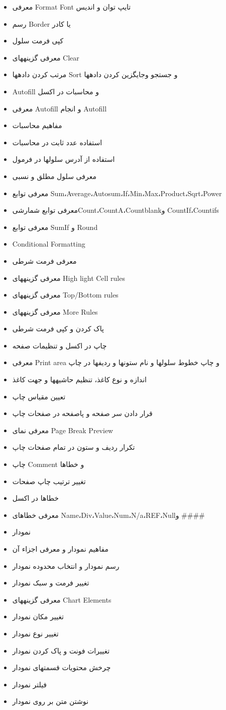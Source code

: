 \begin{itemize}
\item
معرفی Format Font تایپ توان و اندیس
\item
رسم Border یا کادر
\item
کپی فرمت سلول
\item
معرفی گزینه­های Clear
\item
مرتب کردن داده­ها Sort و جستجو وجایگزین کردن داده­ها
\item
Autofill و محاسبات در اکسل
\item
معرفی Autofill و انجام Autofill
\item
مفاهیم محاسبات
\item
استفاده عدد ثابت در محاسبات
\item
استفاده از آدرس سلولها در فرمول
\item
معرفی سلول مطلق و نسبی
\item
معرفی توابع Sum،Average،Autosum،If،Min،Max،Product،Sqrt،Power
\item
معرفی توابع شمارشیCount،CountA،Countblankو CountIf،Countifs
\item
معرفی توابع SumIf و Round
\item
Conditional Formatting
\item
معرفی فرمت شرطی
\item
معرفی گزینه­های High light Cell rules
\item
معرفی گزینه­های Top/Bottom rules
\item
معرفی گزینه­های More Rules
\item
پاک کردن و کپی فرمت شرطی
\item
چاپ در اکسل و تنظیمات صفحه
\item
معرفی Print area و چاپ خطوط سلولها و نام ستونها و ردیفها در چاپ
\item
اندازه و نوع کاغذ، تنظیم حاشیه­ها و جهت کاغذ
\item
تعیین مقیاس چاپ
\item
قرار دادن سر صفحه و پاصفحه در صفحات چاپ
\item
معرفی نمای Page Break Preview
\item
تکرار ردیف و ستون در تمام صفحات چاپ
\item
چاپ Comment و خطاها
\item
تغییر ترتیب چاپ صفحات
\item
خطاها در اکسل
\item
معرفی خطاهای Name،Div،Value،Num،N/a،REF،Nullو
\#\#\#\#
\item
نمودار
\item
مفاهیم نمودار و معرفی اجزاء آن
\item
رسم نمودار و انتخاب محدوده نمودار
\item
تغییر فرمت و سبک نمودار
\item
معرفی گزینه­های Chart Elements
\item
تغییر مکان نمودار
\item
تغییر نوع نمودار
\item
تغییرات فونت و پاک کردن نمودار
\item
چرخش محتویات قسمتهای نمودار
\item
فیلتر نمودار
\item
نوشتن متن بر روی نمودار
\end{itemize}